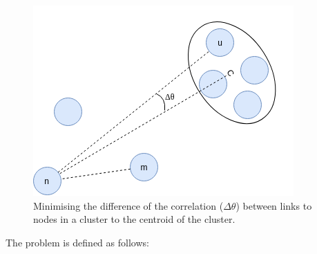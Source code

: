 


\begin{figure}[ht]
    \centering
    \includegraphics[width=.5\textwidth]{figures/clustering/clustering.png}
    \caption{Minimising the difference of the correlation ($\Delta\theta$) between links to nodes in a cluster to the centroid of the cluster.}
    \label{figure:clusteringgoal}
\end{figure}



The problem is defined as follows:

